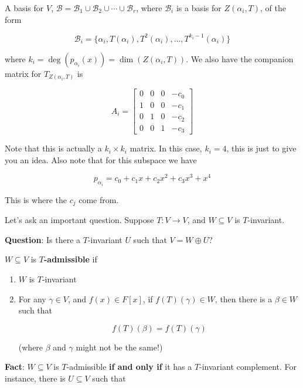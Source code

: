 \documentclass[12pt]{article}
\def\B{\mathcal B}
\begin{document}
  A basis for $V$, $\B = \B_1 \cup \B_2 \cup \cdots \cup \B_r$, where $\B_i$ is
  a basis for $Z(\alpha_i, T)$, of the form

  \[
    \B_i = \{\alpha_i, T(\alpha_i), T^2(\alpha_i), \dots, T^{k_i - 1}(\alpha_i)\}
  \]

  where $k_i = \deg(p_{\alpha_i}(x)) = \dim(Z(\alpha_i, T))$. We also have the
  companion matrix for $T_{Z(\alpha_i, T)}$ is

  \[
    A_i =
    \begin{bmatrix}
      0 & 0 & 0 & - c_0 \\
      1 & 0 & 0 & - c_1 \\
      0 & 1 & 0 & - c_2 \\
      0 & 0 & 1 & - c_3
    \end{bmatrix}
  \]

  Note that this is actually a $k_i \times k_i$ matrix. In this case, $k_i = 4$,
  this is just to give you an idea. Also note that for this subspace we have

  \[
    p_{\alpha_i} = c_0 + c_1 x + c_2 x^2 + c_3 x^3 + x^4
  \]

  This is where the $c_j$ come from.


  Let's ask an important question. Suppose $T: V \to V$, and $W \subseteq V$ is
  $T$-invariant.

  {\bf Question}: Is there a $T$-invariant $U$ such that $V = W \oplus U$?

  \Definition{}
  {
    $W \subseteq V$ is {\bf $T$-admissible} if

    \begin{enumerate}
      \item $W$ is $T$-invariant
      \item For any $\gamma \in V$, and $f(x) \in F[x]$, if $f(T)(\gamma) \in
        W$, then there is a $\beta \in W$ such that

        \[
          f(T)(\beta) = f(T)(\gamma)
        \]

        (where $\beta$ and $\gamma$ might not be the same!)
    \end{enumerate}
  }

  {\bf Fact}: $W \subseteq V$ is $T$-admissible {\bf if and only if} it has a
  $T$-invariant complement. For instance, there is $U \subseteq V$ such that
\end{document}
